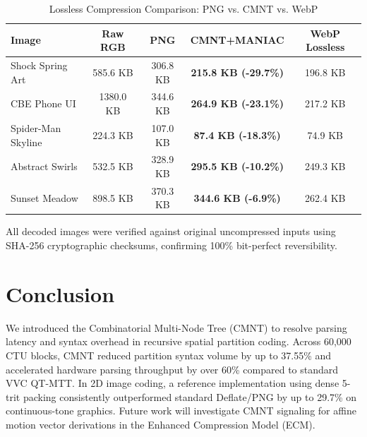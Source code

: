 \documentclass[conference]{IEEEtran}
\begin{document}
\begin{table}[htbp]
\caption{Lossless Compression Comparison: PNG vs. CMNT vs. WebP}
\begin{center}
\begin{tabular}{lcccc}
\toprule
\textbf{Image} & \textbf{Raw RGB} & \textbf{PNG} & \textbf{CMNT+MANIAC} & \textbf{WebP Lossless} \\
\midrule
Shock Spring Art    & 585.6 KB & 306.8 KB & \textbf{215.8 KB (-29.7\%)} & 196.8 KB \\
CBE Phone UI        & 1380.0 KB & 344.6 KB & \textbf{264.9 KB (-23.1\%)} & 217.2 KB \\
Spider-Man Skyline  & 224.3 KB & 107.0 KB & \textbf{87.4 KB (-18.3\%)}  & 74.9 KB \\
Abstract Swirls     & 532.5 KB & 328.9 KB & \textbf{295.5 KB (-10.2\%)} & 249.3 KB \\
Sunset Meadow       & 898.5 KB & 370.3 KB & \textbf{344.6 KB (-6.9\%)}  & 262.4 KB \\
\bottomrule
\end{tabular}
\end{center}
\end{table}

All decoded images were verified against original uncompressed inputs using SHA-256 cryptographic checksums, confirming 100\% bit-perfect reversibility.

\section{Conclusion}
We introduced the Combinatorial Multi-Node Tree (CMNT) to resolve parsing latency and syntax overhead in recursive spatial partition coding. Across 60,000 CTU blocks, CMNT reduced partition syntax volume by up to 37.55\% and accelerated hardware parsing throughput by over 60\% compared to standard VVC QT-MTT. In 2D image coding, a reference implementation using dense 5-trit packing consistently outperformed standard Deflate/PNG by up to 29.7\% on continuous-tone graphics. Future work will investigate CMNT signaling for affine motion vector derivations in the Enhanced Compression Model (ECM).
\end{document}
